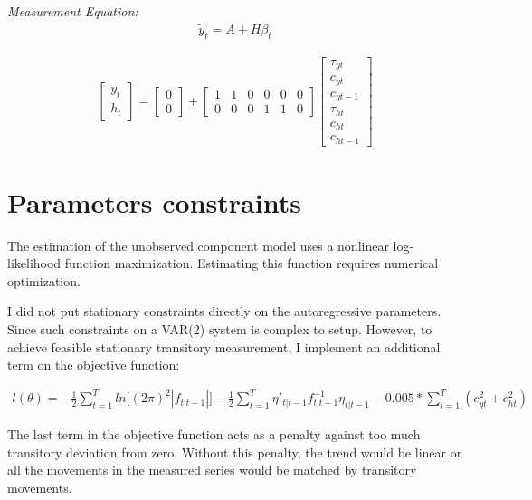 \documentclass[fleqn]{article}
\begin{document}
\begin{outline}[enumerate]
\textit{Measurement Equation:}
\begin{align}
\tilde{y}_t = A + H\beta_t
\end{align}

\begin{align*}
\begin{bmatrix}
y_t	\\
h_t
\end{bmatrix}
=
\begin{bmatrix}
0	\\
0
\end{bmatrix}
+
\begin{bmatrix}
1	& 1	& 0	& 0	& 0 & 0 \\
0	& 0 & 0 & 1 & 1 & 0
\end{bmatrix}
\begin{bmatrix}
\tau_{yt}	\\
c_{yt}		\\
c_{yt-1}	\\
\tau_{ht}	\\
c_{ht}		\\
c_{ht-1}
\end{bmatrix}
\end{align*}
\pagebreak
\section{Parameters constraints}

The estimation of the unobserved component model uses a nonlinear log-likelihood function maximization. Estimating this function requires numerical optimization.


I did not put stationary constraints directly on the autoregressive parameters. Since such constraints on a VAR(2) system is complex to setup. However, to achieve feasible stationary transitory measurement, I implement an additional term on the objective function:

\begin{align}
l(\theta) = -\frac{1}{2}\sum_{t=1}^{T}ln\lbrack(2\pi)^2|f_{t|t-1}|\rbrack
			-\frac{1}{2}\sum_{t=1}^{T}\eta'_{t|t-1}f^{-1}_{t|t-1}\eta_{t|t-1}
			- 0.005*\sum_{t=1}^{T}(c_{yt}^2+c_{ht}^2)
\end{align}

The last term in the objective function acts as a penalty against too much transitory deviation from zero. Without this penalty, the trend would be linear or all the movements in the measured series would be matched by transitory movements.

\vspace{5mm} %


\end{outline}
\end{document}
